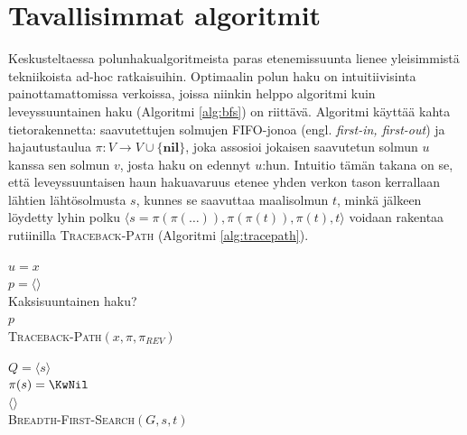 \documentclass[finnish]{tktltiki2}
\newenvironment{finalgo}[1][htb]{
  \renewcommand{\algorithmcfname}{Algoritmi}
  \begin{algorithm}[#1]
}{\end{algorithm}}
\let\oldnl\nl%
\newcommand{\nonl}{\renewcommand{\nl}{\let\nl\oldnl}}
\theoremstyle{definition}
\theoremstyle{remark}
\begin{document}
\section{Tavallisimmat algoritmit}
Keskusteltaessa polunhakualgoritmeista paras etenemissuunta lienee yleisimmistä tekniikoista ad-hoc ratkaisuihin. Optimaalin polun haku on intuitiivisinta painottamattomissa verkoissa, joissa niinkin helppo algoritmi kuin leveyssuuntainen haku (Algoritmi \ref{alg:bfs}) on riittävä. Algoritmi käyttää kahta tietorakennetta: saavutettujen solmujen FIFO-jonoa (engl. \textit{first-in, first-out}) ja hajautustaulua $\pi \colon V \to V \cup \{ \textbf{nil} \}$, joka assosioi jokaisen saavutetun solmun $u$ kanssa sen solmun $v$, josta haku on edennyt $u$:hun. Intuitio tämän takana on se, että leveyssuuntaisen haun hakuavaruus etenee yhden verkon tason kerrallaan lähtien lähtösolmusta $s$, kunnes se saavuttaa maalisolmun $t$, minkä jälkeen löydetty lyhin polku $\langle s = \pi(\pi(\dots)), \pi(\pi(t)), \pi(t), t \rangle$ voidaan rakentaa rutiinilla \textsc{Traceback-Path} (Algoritmi \ref{alg:tracepath}).
\begin{finalgo}
$u = x$ \\
$p = \langle  \rangle$ \\
\nonl Kaksisuuntainen haku? \\
\KwRet $p$ \\
\caption{\textsc{Traceback-Path}$(x, \pi, \pi_{REV})$}
\label{alg:tracepath}
\end{finalgo}

\begin{finalgo}
  $Q = \langle s \rangle$ \\
  $\pi(s) = \KwNil$ \\
  \KwRet $\langle \rangle$ \\
\caption{\textsc{Breadth-First-Search}$(G, s, t)$}
\label{alg:bfs}
\end{finalgo}
\end{document}
